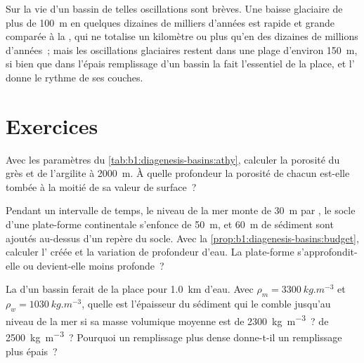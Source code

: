 Sur la vie d'un bassin de telles oscillations sont brèves. Une baisse glaciaire de plus de
\qty{100}{m} en quelques dizaines de milliers d'années est rapide et grande comparée à la
, qui ne totalise un kilomètre ou plus qu'en des dizaines de
millions d'années~; mais les oscillations glaciaires restent dans une plage d'environ
\qty{150}{m}, si bien que dans l'épais remplissage d'un bassin la  fait l'essentiel de
la place, et l' donne le rythme de ses couches.

\section{Exercices}

\begin{exercise}[$\star$]\label{exo:b1:diagenesis-basins:1}
Avec les paramètres du \cref{tab:b1:diagenesis-basins:athy}, calculer la
porosité du grès et de l'argilite à \qty{2000}{m}. À quelle profondeur la
porosité de chacun est-elle tombée à la moitié de sa valeur de surface~?
\end{exercise}

\begin{exercise}[$\star$]\label{exo:b1:diagenesis-basins:2}
Pendant un intervalle de temps, le niveau de la mer monte de \qty{30}{m} par , le
socle d'une plate-forme continentale s'enfonce de \qty{50}{m}, et \qty{60}{m} de sédiment sont
ajoutés au-dessus d'un repère du socle. Avec la
\cref{prop:b1:diagenesis-basins:budget}, calculer l' créée et
la variation de profondeur d'eau. La plate-forme s'approfondit-elle ou devient-elle moins profonde~?
\end{exercise}

\begin{exercise}[$\star$]\label{exo:b1:diagenesis-basins:3}
La  d'un bassin ferait de la place pour \qty{1.0}{km} d'eau. Avec
$\rho_m = \qty{3300}{kg.m^{-3}}$ et $\rho_w = \qty{1030}{kg.m^{-3}}$, quelle est
l'épaisseur du sédiment qui le comble jusqu'au niveau de la mer si sa masse volumique moyenne est de
\qty{2300}{kg.m^{-3}}~? de \qty{2500}{kg.m^{-3}}~? Pourquoi un remplissage plus dense donne-t-il un
remplissage plus épais~?
\end{exercise}

